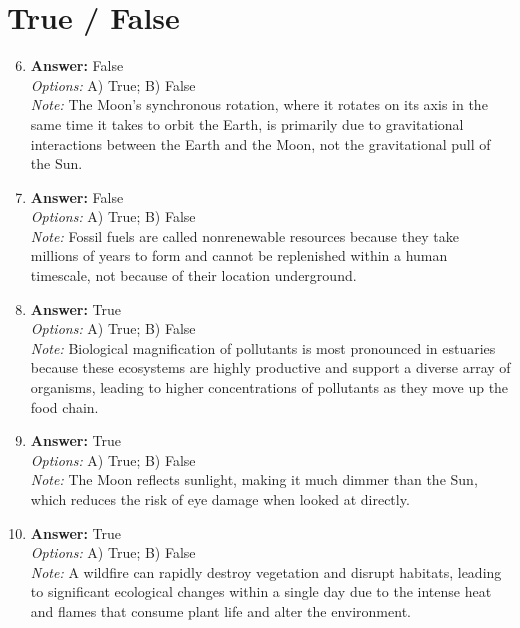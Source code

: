 \documentclass[12pt]{article}
\begin{document}
\section*{True / False}
\begin{enumerate}[label=\arabic*.]
\setcounter{enumi}{5}
\item \textbf{Answer:} False
\\ \textit{Options:} A) True; B) False
\\ \textit{Note:} The Moon's synchronous rotation, where it rotates on its axis in the same time it takes to orbit the Earth, is primarily due to gravitational interactions between the Earth and the Moon, not the gravitational pull of the Sun.
\item \textbf{Answer:} False
\\ \textit{Options:} A) True; B) False
\\ \textit{Note:} Fossil fuels are called nonrenewable resources because they take millions of years to form and cannot be replenished within a human timescale, not because of their location underground.
\item \textbf{Answer:} True
\\ \textit{Options:} A) True; B) False
\\ \textit{Note:} Biological magnification of pollutants is most pronounced in estuaries because these ecosystems are highly productive and support a diverse array of organisms, leading to higher concentrations of pollutants as they move up the food chain.
\item \textbf{Answer:} True
\\ \textit{Options:} A) True; B) False
\\ \textit{Note:} The Moon reflects sunlight, making it much dimmer than the Sun, which reduces the risk of eye damage when looked at directly.
\item \textbf{Answer:} True
\\ \textit{Options:} A) True; B) False
\\ \textit{Note:} A wildfire can rapidly destroy vegetation and disrupt habitats, leading to significant ecological changes within a single day due to the intense heat and flames that consume plant life and alter the environment.
\end{enumerate}
\end{document}
